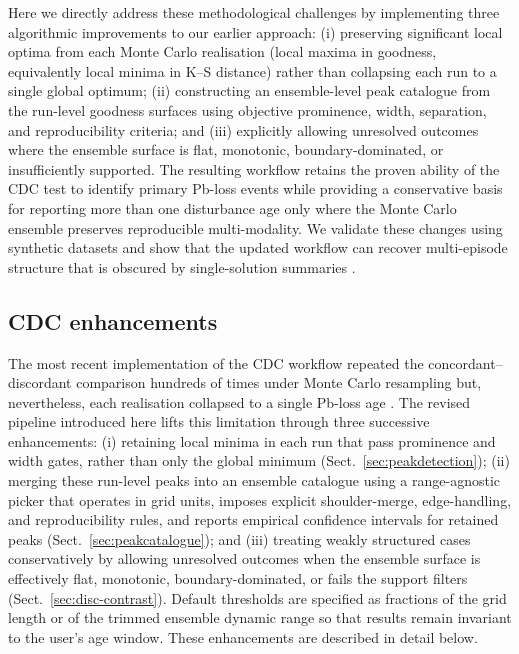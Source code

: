 
Here we directly address these methodological challenges by implementing three algorithmic improvements to our earlier approach: (i) preserving significant local optima from each Monte Carlo realisation (local maxima in goodness, equivalently local minima in K--S distance) rather than collapsing each run to a single global optimum; (ii) constructing an ensemble-level peak catalogue from the run-level goodness surfaces using objective prominence, width, separation, and reproducibility criteria; and (iii) explicitly allowing unresolved outcomes where the ensemble surface is flat, monotonic, boundary-dominated, or insufficiently supported. The resulting workflow retains the proven ability of the CDC test to identify primary Pb-loss events while providing a conservative basis for reporting more than one disturbance age only where the Monte Carlo ensemble preserves reproducible multi-modality. We validate these changes using synthetic datasets and show that the updated workflow can recover multi-episode structure that is obscured by single-solution summaries \citep{Mathieson2025a,Mathieson2025b,Reimink2016,Reimink2025}.

\subsection{CDC enhancements}\label{sec:algorithmic-ext}
The most recent implementation of the CDC workflow repeated the concordant--discordant comparison hundreds of times under Monte Carlo resampling but, nevertheless, each realisation collapsed to a single Pb-loss age \citep{Mathieson2025a}. The revised pipeline introduced here lifts this limitation through three successive enhancements: (i) retaining local minima in each run that pass prominence and width gates, rather than only the global minimum (Sect.~\ref{sec:peakdetection}); (ii) merging these run-level peaks into an ensemble catalogue using a range-agnostic picker that operates in grid units, imposes explicit shoulder-merge, edge-handling, and reproducibility rules, and reports empirical confidence intervals for retained peaks (Sect.~\ref{sec:peakcatalogue}); and (iii) treating weakly structured cases conservatively by allowing unresolved outcomes when the ensemble surface is effectively flat, monotonic, boundary-dominated, or fails the support filters (Sect.~\ref{sec:disc-contrast}). Default thresholds are specified as fractions of the grid length or of the trimmed ensemble dynamic range so that results remain invariant to the user’s age window. These enhancements are described in detail below.

